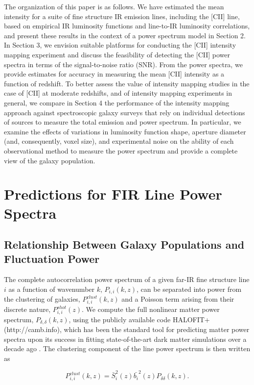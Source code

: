 \documentclass[iop]{emulateapj}
\begin{document}
The organization of this paper is as follows. We have estimated the mean intensity for a suite of fine structure IR emission lines, including the [CII] line, based on empirical IR luminosity functions and line-to-IR luminosity correlations, and present these results in the context of a power spectrum model in Section 2. In Section 3, we envision suitable platforms for conducting the [CII] intensity mapping experiment and discuss the feasibility of detecting the [CII] power spectra in terms of the signal-to-noise ratio (SNR). From the power spectra, we provide estimates for accuracy in measuring the mean [CII] intensity as a function of redshift. To better assess the value of intensity mapping studies in the case of [CII] at moderate redshifts, and of intensity mapping experiments in general, we compare in Section 4 the performance of the intensity mapping approach against spectroscopic galaxy surveys that rely on individual detections of sources to measure the total emission and power spectrum. In particular, we examine the effects of variations in luminosity function shape, aperture diameter (and, consequently, voxel size), and experimental noise on the ability of each observational method to measure the power spectrum and provide a complete view of the galaxy population. 

\section{Predictions for FIR Line Power Spectra}

\subsection{Relationship Between Galaxy Populations and Fluctuation Power}

The complete autocorrelation power spectrum of a given far-IR fine structure line $i$ as a function of wavenumber $k$, $P_{i,i}(k,z)$, can be separated into power from the clustering of galaxies, $P_{i,i}^{clust}(k,z)$ and a Poisson term arising from their discrete nature, $P_{i,i}^{shot}(z)$. We compute the full nonlinear matter power spectrum, $P_{\delta,\delta}(k, z)$, using the publicly available code HALOFIT+ (http://camb.info), which has been the standard tool for predicting matter power spectra upon its success in fitting state-of-the-art dark matter simulations over a decade ago \citep{halofit}.  The clustering component of the line power spectrum is then written as

\begin{equation}
 P_{i,i}^{clust}(k, z) = \bar{S}_{i}^2(z) \bar{b_i}^2(z) P_{\delta\delta}(k, z).
 \label{eq:pclust}
 \end{equation}
\end{document}
